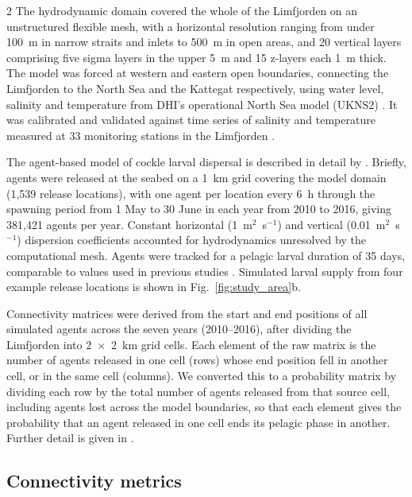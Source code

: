 \begin{spacing}{2}
The hydrodynamic domain covered the whole of the Limfjorden on an unstructured flexible mesh, with a horizontal resolution ranging from under 100~m in narrow straits and inlets to 500~m in open areas, and 20 vertical layers comprising five sigma layers in the upper 5~m and 15 z-layers each 1~m thick. The model was forced at western and eastern open boundaries, connecting the Limfjorden to the North Sea and the Kattegat respectively, using water level, salinity and temperature from DHI's operational North Sea model (UKNS2) \citep{DHI2019NorthSea}. It was calibrated and validated against time series of salinity and temperature measured at 33 monitoring stations in the Limfjorden \citep{erichsen2019limfjorden}. 

The agent-based model of cockle larval dispersal is described in detail by \citet{hansenAssessingDemographicConnectivity2024}. Briefly, agents were released at the seabed on a 1~km grid covering the model domain (1{,}539 release locations), with one agent per location every 6~h through the spawning period from 1 May to 30 June in each year from 2010 to 2016, giving 381{,}421 agents per year. Constant horizontal (1~m$^2$~s$^{-1}$) and vertical (0.01~m$^2$~s$^{-1}$) dispersion coefficients accounted for hydrodynamics unresolved by the computational mesh. Agents were tracked for a pelagic larval duration of 35 days, comparable to values used in previous studies \citep[e.g.][]{cosciaFinescaleSeascapeGenomics2020}. Simulated larval supply from four example release locations is shown in Fig.~\ref{fig:study_area}b.

Connectivity matrices were derived from the start and end positions of all simulated agents across the seven years (2010--2016), after dividing the Limfjorden into 2~$\times$~2~km grid cells. Each element of the raw matrix is the number of agents released in one cell (rows) whose end position fell in another cell, or in the same cell (columns). We converted this to a probability matrix by dividing each row by the total number of agents released from that source cell, including agents lost across the model boundaries, so that each element gives the probability that an agent released in one cell ends its pelagic phase in another. Further detail is given in \citet{hansenAssessingDemographicConnectivity2024}.

\subsection{Connectivity metrics}



\end{spacing}
